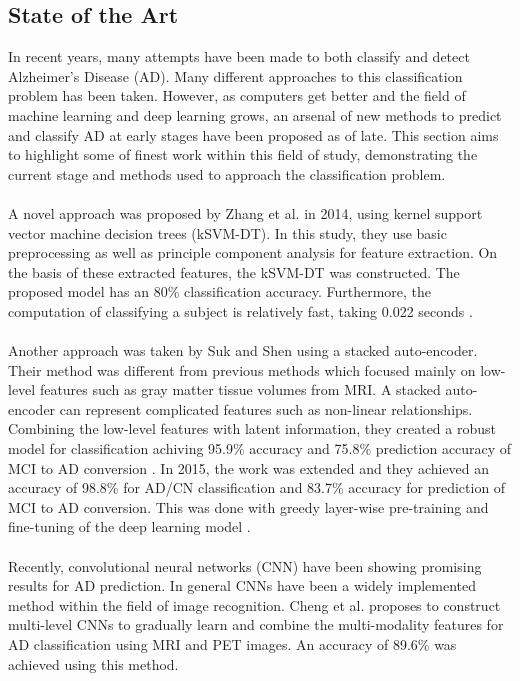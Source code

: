 \documentclass[11pt, fleqn, titlepage]{article}
\newcommand{\1}[1]{\mathds{1}\left[#1\right]}
\begin{document}
\subsection{State of the Art}\label{statens_kunst}
In recent years, many attempts have been made to both classify and detect Alzheimer's Disease (AD). Many different approaches to this classification problem has been taken. However, as computers get better and the field of machine learning and deep learning grows, an arsenal of new methods to predict and classify AD at early stages have been proposed as of late. This section aims to highlight some of finest work within this field of study, demonstrating the current stage and methods used to approach the classification problem. 
\\\\
\noindent
A novel approach was proposed by Zhang et al. in 2014, using kernel support vector machine decision trees (kSVM-DT). In this study, they use basic preprocessing as well as principle component analysis for feature extraction. On the basis of these extracted features, the kSVM-DT was constructed. The proposed model has an 80\% classification accuracy. Furthermore, the computation of classifying a subject is relatively fast, taking 0.022 seconds \cite{yudong}. 
\\\\
Another approach was taken by Suk and Shen using a stacked auto-encoder. Their method was different from previous methods which focused mainly on low-level features such as gray matter tissue volumes from MRI. A stacked auto-encoder can represent complicated features such as non-linear relationships. Combining the low-level features with latent information, they created a robust model for classification achiving 95.9\% accuracy and 75.8\% prediction accuracy of MCI to AD conversion \cite{suk_and_shen_1}. In 2015, the work was extended and they achieved an accuracy of  98.8\% for AD/CN classification and 83.7\% accuracy for prediction of MCI to AD conversion. This was done with greedy layer-wise pre-training and fine-tuning of the deep learning model \cite{suk_and_shen_2}.
\\\\
Recently, convolutional neural networks (CNN) have been showing promising results for AD prediction. In general CNNs have been a widely implemented method within the field of image recognition. Cheng et al. proposes to construct multi-level CNNs to gradually learn and combine the multi-modality features for AD classification using MRI and PET images. An accuracy of 89.6\% was achieved using this method. \cite{cheng}
\end{document}
